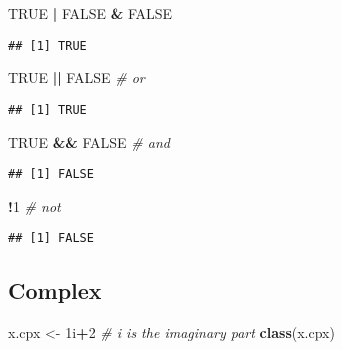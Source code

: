 \documentclass[
  12pt,
]{article}
\newenvironment{Shaded}{\begin{snugshade}}{\end{snugshade}}
\newcommand{\CommentTok}[1]{\textcolor[rgb]{0.56,0.35,0.01}{\textit{#1}}}
\newcommand{\ConstantTok}[1]{\textcolor[rgb]{0.56,0.35,0.01}{#1}}
\newcommand{\DataTypeTok}[1]{\textcolor[rgb]{0.13,0.29,0.53}{#1}}
\newcommand{\DecValTok}[1]{\textcolor[rgb]{0.00,0.00,0.81}{#1}}
\newcommand{\FunctionTok}[1]{\textcolor[rgb]{0.13,0.29,0.53}{\textbf{#1}}}
\newcommand{\NormalTok}[1]{#1}
\newcommand{\OtherTok}[1]{\textcolor[rgb]{0.56,0.35,0.01}{#1}}
\newcommand{\SpecialCharTok}[1]{\textcolor[rgb]{0.81,0.36,0.00}{\textbf{#1}}}
\begin{document}
\begin{Shaded}
\begin{Highlighting}[]
\ConstantTok{TRUE} \SpecialCharTok{|}  \ConstantTok{FALSE} \SpecialCharTok{\&} \ConstantTok{FALSE}   
\end{Highlighting}
\end{Shaded}

\begin{verbatim}
## [1] TRUE
\end{verbatim}

\begin{Shaded}
\begin{Highlighting}[]
\ConstantTok{TRUE} \SpecialCharTok{||} \ConstantTok{FALSE}           \CommentTok{\# or}
\end{Highlighting}
\end{Shaded}

\begin{verbatim}
## [1] TRUE
\end{verbatim}

\begin{Shaded}
\begin{Highlighting}[]
\ConstantTok{TRUE} \SpecialCharTok{\&\&} \ConstantTok{FALSE}           \CommentTok{\# and}
\end{Highlighting}
\end{Shaded}

\begin{verbatim}
## [1] FALSE
\end{verbatim}

\begin{Shaded}
\begin{Highlighting}[]
\SpecialCharTok{!}\DecValTok{1}                      \CommentTok{\# not}
\end{Highlighting}
\end{Shaded}

\begin{verbatim}
## [1] FALSE
\end{verbatim}

\newpage
\subsection{Complex}
\label{sec:VAR-complex}

\begin{Shaded}
\begin{Highlighting}[]
\NormalTok{x.cpx }\OtherTok{\textless{}{-}} \DecValTok{1}\DataTypeTok{i}\SpecialCharTok{+}\DecValTok{2}  \CommentTok{\# \textquotesingle{}i\textquotesingle{} is the imaginary part}
\FunctionTok{class}\NormalTok{(x.cpx)}
\end{Highlighting}
\end{Shaded}
\end{document}
